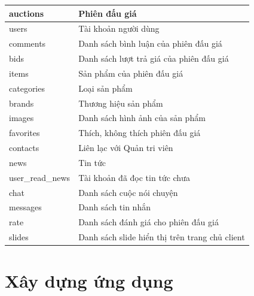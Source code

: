 \documentclass[../DoAn.tex]{subfiles}
\begin{document}
    \begin{supertabular}{| p{.30\textwidth} | p{.60\textwidth} |} 
    \hline
        auctions & Phiên đấu giá\\\hline
        users & Tài khoản người dùng\\\hline
        comments & Danh sách bình luận của phiên đấu giá\\\hline
        bids& Danh sách lượt trả giá của phiên đấu giá\\\hline
        items& Sản phẩm của phiên đấu giá\\\hline
        categories& Loại sản phẩm\\\hline
        brands& Thương hiệu sản phẩm\\\hline
        images& Danh sách hình ảnh của sản phẩm\\\hline
        favorites& Thích, không thích phiên đấu giá\\\hline
        contacts& Liên lạc với Quản tri viên\\\hline
        news& Tin tức\\\hline
        user\_read\_news& Tài khoản đã đọc tin tức chưa\\\hline
        chat& Danh sách cuộc nói chuyện\\\hline
        messages& Danh sách tin nhắn\\\hline
        rate& Danh sách đánh giá cho phiên đấu giá\\\hline
        slides & Danh sách slide hiển thị trên trang chủ client\\\hline
    \end{supertabular}
\section{Xây dựng ứng dụng}
\end{document}
